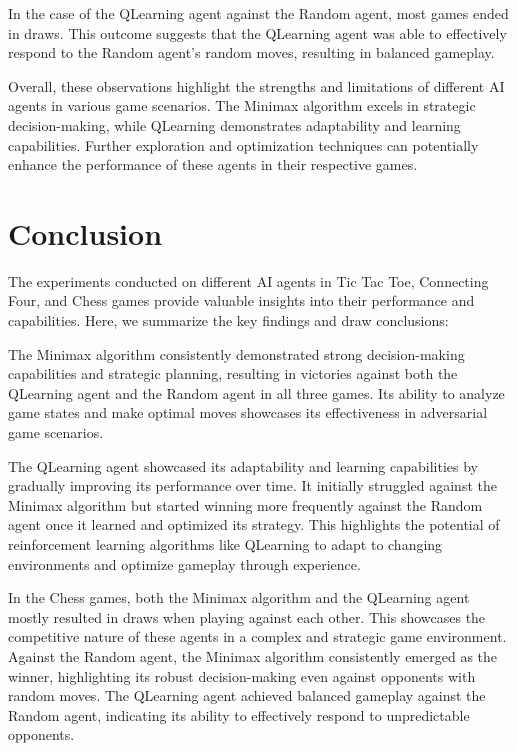 \documentclass{article}
\begin{document}
In the case of the QLearning agent against the Random agent, most games ended in draws. This outcome suggests that the QLearning agent was able to effectively respond to the Random agent's random moves, resulting in balanced gameplay.

Overall, these observations highlight the strengths and limitations of different AI agents in various game scenarios. The Minimax algorithm excels in strategic decision-making, while QLearning demonstrates adaptability and learning capabilities. Further exploration and optimization techniques can potentially enhance the performance of these agents in their respective games.


\section{Conclusion}

The experiments conducted on different AI agents in Tic Tac Toe, Connecting Four, and Chess games provide valuable insights into their performance and capabilities. Here, we summarize the key findings and draw conclusions:

The Minimax algorithm consistently demonstrated strong decision-making capabilities and strategic planning, resulting in victories against both the QLearning agent and the Random agent in all three games. Its ability to analyze game states and make optimal moves showcases its effectiveness in adversarial game scenarios.

The QLearning agent showcased its adaptability and learning capabilities by gradually improving its performance over time. It initially struggled against the Minimax algorithm but started winning more frequently against the Random agent once it learned and optimized its strategy. This highlights the potential of reinforcement learning algorithms like QLearning to adapt to changing environments and optimize gameplay through experience.

In the Chess games, both the Minimax algorithm and the QLearning agent mostly resulted in draws when playing against each other. This showcases the competitive nature of these agents in a complex and strategic game environment. Against the Random agent, the Minimax algorithm consistently emerged as the winner, highlighting its robust decision-making even against opponents with random moves. The QLearning agent achieved balanced gameplay against the Random agent, indicating its ability to effectively respond to unpredictable opponents.
\end{document}

